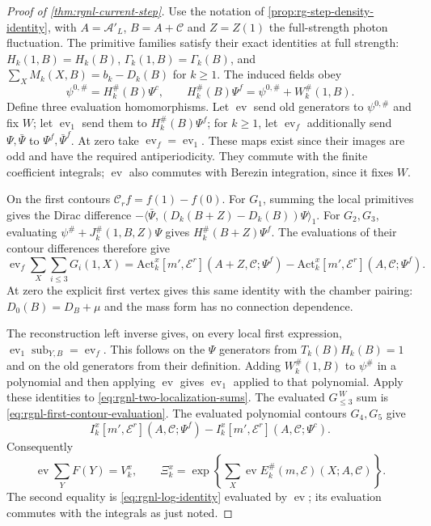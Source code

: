 \documentclass[11pt,letterpaper,reqno]{amsart}
\begin{document}
\begin{proof}[Proof of \cref{thm:rgnl-current-step}]
Use the notation of \cref{prop:rg-step-density-identity},
with $A=\mathscr A'_L$, $B=A+\mathscr C$ and
$Z=Z(1)$ the full-strength photon fluctuation.
The primitive families satisfy their exact identities
at full strength:
$H_k(1,B)=H_k(B)$, $\Gamma_k(1,B)=\Gamma_k(B)$, and
$\sum_XM_k(X,B)=b_k-D_k(B)$ for $k\ge1$.
The induced fields obey
\[
 \psi^{0,\#}=H_k^\#(B)\Psi^c,\qquad
 H_k^\#(B)\Psi^f=\psi^{0,\#}+W_k^\#(1,B).
\]
Define three evaluation homomorphisms. Let $\operatorname{ev}$
send old generators to $\psi^{0,\#}$ and fix $W$;
let $\operatorname{ev}_1$ send them to $H_k^\#(B)\Psi^f$;
for $k\ge1$, let $\operatorname{ev}_f$ additionally send
$\Psi,\bar\Psi$ to $\Psi^f,\bar\Psi^f$.
At zero take $\operatorname{ev}_f=\operatorname{ev}_1$.
These maps exist since their images are odd and have
the required antiperiodicity. They commute with the
finite coefficient integrals; $\operatorname{ev}$ also
commutes with Berezin integration, since it fixes $W$.

On the first contours $\mathcal C_rf=f(1)-f(0)$.
For $G_1$, summing the local primitives gives the
Dirac difference
$-\langle\bar\Psi,(D_k(B+Z)-D_k(B))\Psi\rangle_1$.
For $G_2,G_3$, evaluating
$\psi^\#+J_k^\#(1,B,Z)\Psi$ gives
$H_k^\#(B+Z)\Psi^f$.
The evaluations of their contour differences therefore give
\begin{equation}\label{eq:rgnl-first-contour-evaluation}
 \operatorname{ev}_f\sum_X\sum_{i\le3}G_i(1,X)
  =\mathrm{Act}_k^x[m',\mathscr E^r](A+Z,\mathscr C;\Psi^f)
       -\mathrm{Act}_k^x[m',\mathscr E^r](A,\mathscr C;\Psi^f).
\end{equation}
At zero the explicit first vertex gives this same
identity with the chamber pairing: $D_0(B)=D_B+\mu$
and the mass form has no connection dependence.

The reconstruction left inverse gives, on every local
first expression,
$\operatorname{ev}_1\operatorname{sub}_{Y,B}
=\operatorname{ev}_f$.
This follows on the $\Psi$ generators from $T_k(B)H_k(B)=1$
and on the old generators from their definition.
Adding $W_k^\#(1,B)$ to $\psi^\#$ in a polynomial and then
applying $\operatorname{ev}$ gives
$\operatorname{ev}_1$ applied to that polynomial.
Apply these identities to
\eqref{eq:rgnl-two-localization-sums}.
The evaluated $G_{\le3}^{\,W}$ sum is
\eqref{eq:rgnl-first-contour-evaluation}.
The evaluated polynomial contours $G_4,G_5$ give
\[
 I_k^x[m',\mathscr E^r](A,\mathscr C;\Psi^f)
                      -I_k^x[m',\mathscr E^r](A,\mathscr C;\Psi^c).
\]
Consequently
\[
 \operatorname{ev}\sum_YF(Y)=V_k^x,\qquad
 \Xi_k^x
     =\exp\left\{\sum_X
                  \operatorname{ev}E_k^\#(m,\mathscr E)(X;A,\mathscr C)\right\}.
\]
The second equality is
\eqref{eq:rgnl-log-identity} evaluated by
$\operatorname{ev}$; its evaluation commutes with the
integrals as just noted.


\end{proof}
\end{document}
